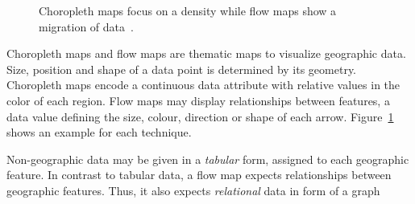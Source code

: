 \begin{figure}
  \centering
  \qquad
  \caption{Choropleth maps focus on a density while flow maps show a migration of data~\parencite{VisualizationCatalogue2017}.}%
  \label{fig:analysis:geographical}
\end{figure}

Choropleth maps and flow maps are thematic maps to visualize geographic data.
Size, position and shape of a data point is determined by its geometry.
Choropleth maps encode a continuous data attribute with relative values in the color of each region.
Flow maps may display relationships between features, a data value defining the size, colour, direction or shape of each arrow.
Figure~\ref{fig:analysis:geographical} shows an example for each technique.

Non-geographic data may be given in a \emph{tabular} form, assigned to each geographic feature.
In contrast to tabular data, a flow map expects relationships between geographic features.
Thus, it also expects \emph{relational} data in form of a graph



